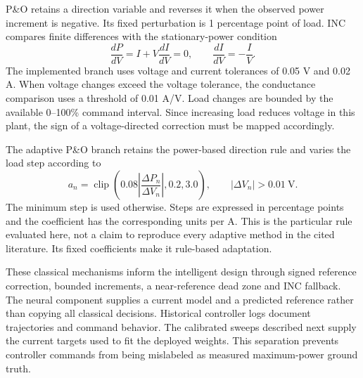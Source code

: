 P\&O retains a direction variable and reverses it when the observed power increment is negative. Its fixed perturbation is 1 percentage point of load. INC compares finite differences with the stationary-power condition
\begin{equation}
 \frac{dP}{dV}=I+V\frac{dI}{dV}=0,
 \qquad \frac{dI}{dV}=-\frac{I}{V}.
\end{equation}
The implemented branch uses voltage and current tolerances of 0.05 V and 0.02 A. When voltage changes exceed the voltage tolerance, the conductance comparison uses a threshold of 0.01 A/V. Load changes are bounded by the available 0--100\% command interval. Since increasing load reduces voltage in this plant, the sign of a voltage-directed correction must be mapped accordingly.

The adaptive P\&O branch retains the power-based direction rule and varies the load step according to
\begin{equation}
 a_n=\operatorname{clip}\left(0.08\left|\frac{\Delta P_n}{\Delta V_n}\right|,0.2,3.0\right),
 \qquad |\Delta V_n|>0.01\ \mathrm{V}.
\end{equation}
The minimum step is used otherwise. Steps are expressed in percentage points and the coefficient has the corresponding units per A. This is the particular rule evaluated here, not a claim to reproduce every adaptive method in the cited literature. Its fixed coefficients make it rule-based adaptation.

These classical mechanisms inform the intelligent design through signed reference correction, bounded increments, a near-reference dead zone and INC fallback. The neural component supplies a current model and a predicted reference rather than copying all classical decisions. Historical controller logs document trajectories and command behavior. The calibrated sweeps described next supply the current targets used to fit the deployed weights. This separation prevents controller commands from being mislabeled as measured maximum-power ground truth.

